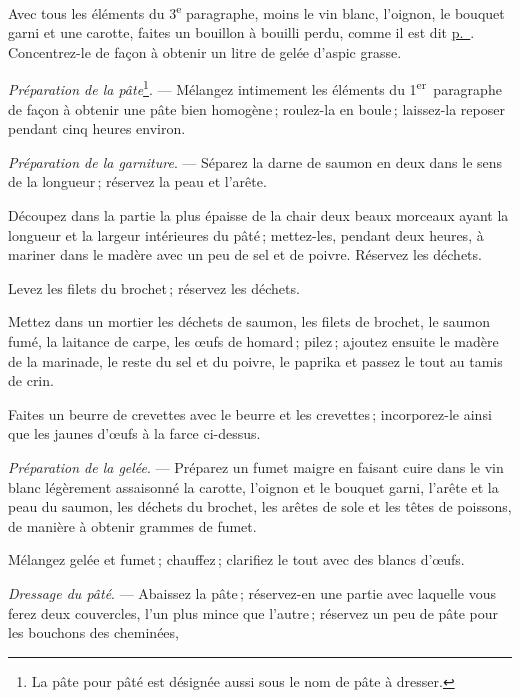 Avec tous les éléments du 3\textsuperscript{e} paragraphe, moins le vin blanc,
l'oignon, le bouquet garni et une carotte, faites un bouillon à bouilli perdu,
comme il est dit \hyperlink{p0201}{p. \pageref{pg0201}}. Concentrez-le de façon
à obtenir un litre de gelée d'aspic grasse.

\medskip

\textit{Préparation de la pâte}\footnote{La pâte pour pâté est désignée aussi
sous le nom de pâte à dresser.}. — Mélangez intimement les éléments du
1\textsuperscript{er} paragraphe de façon à obtenir une pâte bien homogène ;
roulez-la en boule ; laissez-la reposer pendant cinq heures environ.

\medskip

\textit{Préparation de la garniture}. — Séparez la darne de saumon en deux dans
le sens de la longueur ; réservez la peau et l'arête.

Découpez dans la partie la plus épaisse de la chair deux beaux morceaux ayant
la longueur et la largeur intérieures du pâté ; mettez-les, pendant deux
heures, à mariner dans le madère avec un peu de sel et de poivre. Réservez les
déchets.

Levez les filets du brochet ; réservez les déchets.

Mettez dans un mortier les déchets de saumon, les filets de brochet, le saumon
fumé, la laitance de carpe, les œufs de homard ; pilez ; ajoutez ensuite le
madère de la marinade, le reste du sel et du poivre, le paprika et passez le
tout au tamis de crin.

Faites un beurre de crevettes avec le beurre et les crevettes ; incorporez-le
ainsi que les jaunes d'œufs à la farce ci-dessus.

\medskip

\textit{Préparation de la gelée}. — Préparez un fumet maigre en faisant cuire
dans le vin blanc légèrement assaisonné la carotte, l'oignon et le bouquet
garni, l'arête et la peau du saumon, les déchets du brochet, les arêtes de sole
et les têtes de poissons, de manière à obtenir {\mmm} grammes de fumet.

Mélangez gelée et fumet ; chauffez ; clarifiez le tout avec des blancs d'œufs.

\medskip

\textit{Dressage du pâté}. — Abaissez la pâte ; réservez-en une partie avec
laquelle vous ferez deux couvercles, l'un plus mince que l’autre ; réservez un
peu de pâte pour les bouchons des cheminées,

